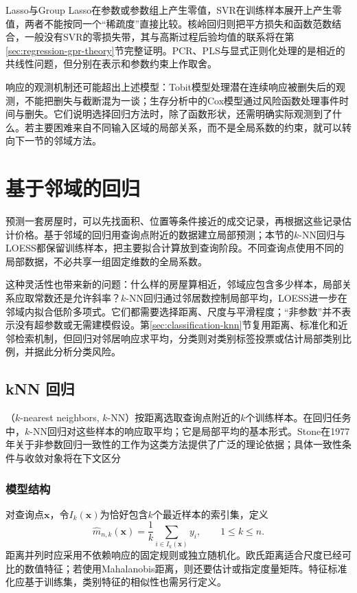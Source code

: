 Lasso与Group Lasso在参数或参数组上产生零值，SVR在训练样本展开上产生零值，两者不能按同一个“稀疏度”直接比较。核岭回归则把平方损失和函数范数结合，一般没有SVR的零损失带，其与高斯过程后验均值的联系将在第\ref{sec:regression-gpr-theory}节完整证明。PCR、PLS与显式正则化处理的是相近的共线性问题，但分别在表示和参数约束上作取舍。

响应的观测机制还可能超出上述模型：Tobit模型处理潜在连续响应被删失后的观测，不能把删失与截断混为一谈；生存分析中的Cox模型通过风险函数处理事件时间与删失。它们说明选择回归方法时，除了函数形状，还需明确实际观测到了什么。若主要困难来自不同输入区域的局部关系，而不是全局系数的约束，就可以转向下一节的邻域方法。

\section{基于邻域的回归}
\label{sec:regression-instance}

预测一套房屋时，可以先找面积、位置等条件接近的成交记录，再根据这些记录估计价格。基于邻域的回归用查询点附近的数据建立局部预测；本节的$k$-NN回归与LOESS都保留训练样本，把主要拟合计算放到查询阶段。不同查询点使用不同的局部数据，不必共享一组固定维数的全局系数。

这种灵活性也带来新的问题：什么样的房屋算相近，邻域应包含多少样本，局部关系应取常数还是允许斜率？$k$-NN回归通过邻居数控制局部平均，LOESS进一步在邻域内拟合低阶多项式。它们都需要选择距离、尺度与平滑程度；“非参数”并不表示没有超参数或无需建模假设。第\ref{sec:classification-knn}节复用距离、标准化和近邻检索机制，但回归对邻居响应求平均，分类则对类别标签投票或估计局部类别比例，并据此分析分类风险。

\subsection{kNN 回归}
\label{sec:regression-knn}

（$k$-nearest neighbors, $k$-NN）按距离选取查询点附近的$k$个训练样本。在回归任务中，$k$-NN回归对这些样本的响应取平均；它是局部平均的基本形式。Stone在1977年关于非参数回归一致性的工作为这类方法提供了广泛的理论依据；具体一致性条件与收敛对象将在下文区分

\subsubsection{模型结构}

对查询点$\bm{x}$，令$I_k(\bm{x})$为恰好包含$k$个最近样本的索引集，定义
\begin{equation}
  \widehat m_{n,k}(\bm{x})=\frac1k\sum_{i\in I_k(\bm{x})}y_i,
  \qquad 1\leq k\leq n.
  \label{eq:regression-knn}
\end{equation}
距离并列时应采用不依赖响应的固定规则或独立随机化。欧氏距离适合尺度已经可比的数值特征；若使用Mahalanobis距离，则还要估计或指定度量矩阵。特征标准化应基于训练集，类别特征的相似性也需另行定义。

